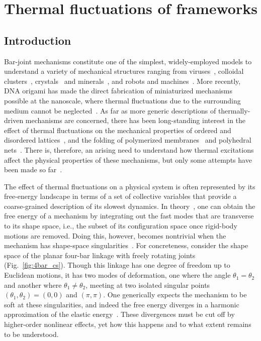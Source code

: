 
\chapter{Thermal fluctuations of frameworks}


\section{Introduction}

Bar-joint mechanisms constitute one of the simplest, widely-employed models to understand a variety of mechanical structures ranging from viruses~\cite{hespenheide2004},
colloidal clusters~\cite{holmes-cerfon2013,kallus2017,holmes-cerfon2017,robinson2019},
crystals~\cite{power2014} and minerals~\cite{kapko2011}, %
and robots and machines~\cite{farber2008,donelan2007}.
More recently, DNA origami has made the direct fabrication of miniaturized mechanisms possible at the nanoscale, where thermal fluctuations due to the surrounding medium cannot be neglected~\cite{marras2015,jung2020}.
As far as more generic descriptions of thermally-driven mechanisms are concerned, there has been long-standing interest in the effect of thermal fluctuations on the mechanical properties of ordered and disordered lattices~\cite{zhang2016,woodhouse2018,yan2018}, and the folding of polymerized membranes~\cite{di-francesco2000,nelson2004} and polyhedral nets~\cite{shenoy2012,dodd2018,melo2020}.
There is, therefore, an arising need to understand how thermal excitations affect the physical properties of these mechanisms, but only some attempts have been made so far~\cite{kallus2017,rocklin2018}.

The effect of thermal fluctuations on a physical system is often represented by its free-energy landscape in terms of a set of collective variables that provide a coarse-grained description of its slowest dynamics.
In theory~\cite{go1976,echenique2011}, one can obtain the free energy of a mechanism by integrating out the fast modes that are transverse to its shape space, i.e., the subset of its configuration space once rigid-body motions are removed.
Doing this, however, becomes nontrivial when the mechanism has shape-space singularities~\cite{zlatanov2002,liu2003,donelan2007}.
For concreteness, consider the shape space of the planar four-bar linkage with freely rotating joints~\cite{grashof1883,hartenberg1964,shimamoto2005} (Fig.~\ref{fig:4bar_cs}).
Though this linkage has one degree of freedom up to Euclidean motions, it has two modes of deformation, one where the angle $\theta_1 = \theta_2$ and another where $\theta_1 \ne \theta_2$, meeting at two isolated singular points $(\theta_1,\theta_2) = (0,0)$ and $(\pi,\pi)$.
One generically expects the mechanism to be soft at these singularities, and indeed the free energy diverges in a harmonic approximation of the elastic energy~\cite{rocklin2018}.
These divergences must be cut off by higher-order nonlinear effects, yet how this happens and to what extent remains to be understood.

